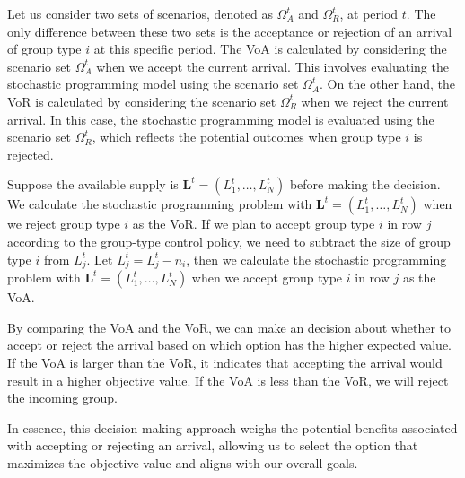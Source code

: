 Let us consider two sets of scenarios, denoted as $\Omega^{t}_{A}$ and $\Omega^{t}_{R}$, at period $t$. The only difference between these two sets is the acceptance or rejection of an arrival of group type $i$ at this specific period. The VoA is calculated by considering the scenario set $\Omega^{t}_{A}$ when we accept the current arrival. This involves evaluating the stochastic programming model using the scenario set $\Omega^{t}_{A}$. On the other hand, the VoR is calculated by considering the scenario set $\Omega^{t}_{R}$ when we reject the current arrival. In this case, the stochastic programming model is evaluated using the scenario set $\Omega^{t}_{R}$, which reflects the potential outcomes when group type $i$ is rejected.

Suppose the available supply is $\mathbf{L}^{t} = (L_1^{t}, \ldots, L_N^{t})$ before making the decision. We calculate the stochastic programming problem with $\mathbf{L}^{t}= (L_1^{t}, \ldots, L_N^{t})$ when we reject group type $i$ as the VoR. If we plan to accept group type $i$ in row $j$ according to the group-type control policy, we need to subtract the size of group type $i$ from $L_j^{t}$. Let $L_j^{t} = L_j^{t} - n_{i}$, then we calculate the stochastic programming problem with $\mathbf{L}^{t}= (L_1^{t}, \ldots, L_N^{t})$ when we accept group type $i$ in row $j$ as the VoA.

By comparing the VoA and the VoR, we can make an decision about whether to accept or reject the arrival based on which option has the higher expected value. If the VoA is larger than the VoR, it indicates that accepting the arrival would result in a higher objective value. If the VoA is less than the VoR, we will reject the incoming group.



In essence, this decision-making approach weighs the potential benefits associated with accepting or rejecting an arrival, allowing us to select the option that maximizes the objective value and aligns with our overall goals.


